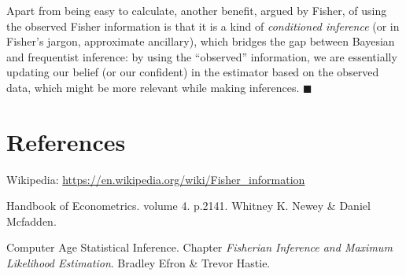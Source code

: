 \documentclass[a4paper,11pt]{article}
\begin{document}
Apart from being easy to calculate,
another benefit, argued by Fisher, of using the observed Fisher information 
is that it is a kind of \emph{conditioned inference}
(or in Fisher's jargon, approximate ancillary),
which bridges the gap between Bayesian and frequentist inference:
by using the ``observed'' information,
we are essentially updating our belief (or our confident) in the estimator based on the observed data,
which might be more relevant while making inferences.
\hfill$\blacksquare$

\vfill

\section*{References}

\begin{enumerate}[label = {[\arabic*]}]
	\item Wikipedia: \url{https://en.wikipedia.org/wiki/Fisher_information}
	\item Handbook of Econometrics. volume 4. p.2141. Whitney K. Newey \& Daniel Mcfadden.  
	\item Computer Age Statistical Inference. Chapter \emph{Fisherian Inference and Maximum Likelihood Estimation}. Bradley Efron \& Trevor Hastie.
\end{enumerate}
\end{document}
